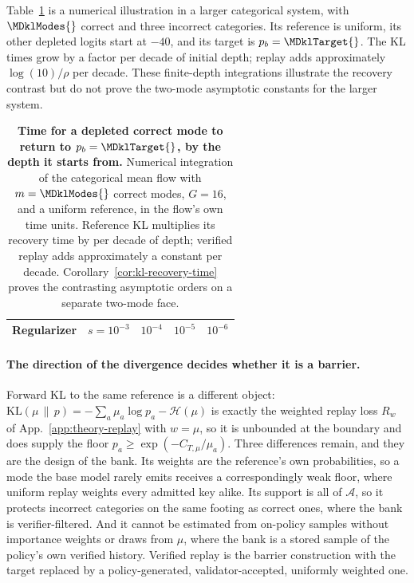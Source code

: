 \documentclass{article}
\newcommand{\1}{\mathbf 1}
\theoremstyle{remark}
\theoremstyle{definition}
\theoremstyle{plain}
\begin{document}
Table~\ref{tab:kl-recovery} is a numerical illustration in a larger
categorical system, with $\MDklModes{}$ correct and three incorrect categories.
Its reference is uniform, its other depleted logits start at $-40$, and its
target is $p_b=\MDklTarget{}$. The KL times grow by a factor
\MDklDecadeKL{} per decade of initial depth; replay adds approximately
$\log(10)/\rho$ per decade. These finite-depth integrations illustrate the
recovery contrast but do not prove the two-mode asymptotic constants for
the larger system.

\begin{table}[t]
  \centering
  \caption{\textbf{Time for a depleted correct mode to return to
  $p_b=\MDklTarget{}$, by the depth it starts from.} Numerical integration of
  the categorical mean flow with $m=\MDklModes{}$ correct modes, $G=16$, and a
  uniform reference, in the flow's own time units. Reference KL multiplies its
  recovery time by \MDklDecadeKL{} per decade of depth; verified replay adds
  approximately a constant per decade. Corollary~\ref{cor:kl-recovery-time}
  proves the contrasting asymptotic orders on a separate two-mode face.}
  \label{tab:kl-recovery}
  \small
  \setlength{\tabcolsep}{6pt}
  \begin{tabular}{@{}lrrrr@{}}
    \toprule
    \textbf{Regularizer} & $s=10^{-3}$ & $10^{-4}$ & $10^{-5}$ & $10^{-6}$ \\
    \midrule
    
  \end{tabular}
\end{table}

\paragraph{The direction of the divergence decides whether it is a barrier.}
Forward KL to the same reference is a different object:
$\mathrm{KL}(\mu\,\|\,p)=-\sum_a\mu_a\log p_a-\mathcal H(\mu)$ is exactly the
weighted replay loss $R_w$ of
App.~\ref{app:theory-replay} with $w=\mu$, so it is unbounded at the
boundary and does supply the floor $p_a\ge\exp(-C_{T,\mu}/\mu_a)$. Three
differences remain, and they are the design of the bank. Its weights are the
reference's own probabilities, so a mode the base model rarely emits receives
a correspondingly weak floor, where uniform replay weights every admitted key
alike. Its support is all of $\mathcal A$, so it protects incorrect categories
on the same footing as correct ones, where the bank is verifier-filtered.
And it cannot be estimated from on-policy samples without importance weights or
draws from $\mu$, where the bank is a stored sample of the policy's own
verified history. Verified replay is the barrier construction with the target
replaced by a policy-generated, validator-accepted, uniformly weighted one.
\end{document}
